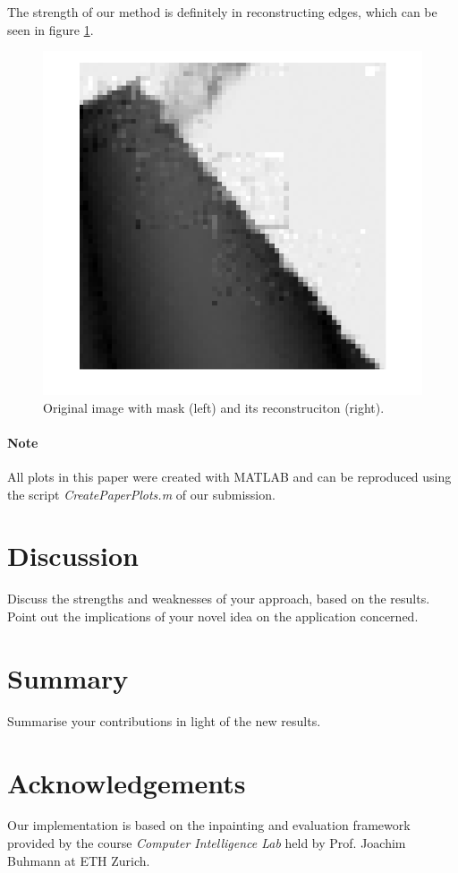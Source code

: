 \documentclass[10pt,conference,compsocconf]{IEEEtran}
\begin{document}
The strength of our method is definitely in reconstructing edges, which can be seen in figure \ref{edge_reconstruction}.

\begin{figure}
\centering
\includegraphics[width=\columnwidth]{images/framing_artifacts.png}
\caption{Original image with mask (left) and its reconstruciton (right).}
\label{edge_reconstruction}
\end{figure}

\paragraph{Note} All plots in this paper were created with MATLAB and can be reproduced using the script \emph{CreatePaperPlots.m} of our submission.

\section{Discussion}
Discuss the strengths and weaknesses of your approach, based on the results. Point out the implications of your novel idea on the application concerned.

\section{Summary}
Summarise your contributions in light of the new results.

\section*{Acknowledgements}
Our implementation is based on the inpainting and evaluation framework provided by the course \emph{Computer Intelligence Lab} held by Prof. Joachim Buhmann at ETH Zurich.



\end{document}

